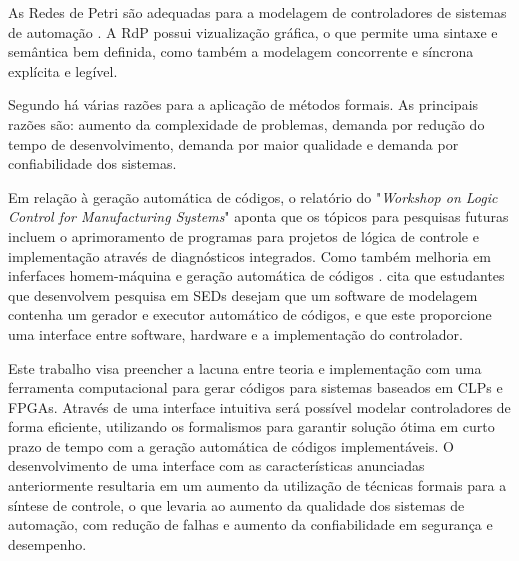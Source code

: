 As Redes de Petri s\~ao adequadas para a modelagem de controladores de sistemas de automa\c{c}\~ao \cite{gomes2007}. A RdP possui vizualiza\c{c}\~ao gr\'afica, o que permite uma sintaxe e sem\^antica bem definida, como tamb\'em a modelagem concorrente e s\'incrona expl\'icita e leg\'ivel.

Segundo \cite{Litz2000} h\'a v\'arias raz\~oes para a aplica\c{c}\~ao de m\'etodos formais. As principais raz\~oes s\~ao: aumento da complexidade de problemas, demanda por redu\c{c}\~ao do tempo de desenvolvimento, demanda por maior qualidade e demanda por confiabilidade dos sistemas.

Em rela\c{c}\~ao \`a gera\c{c}\~ao autom\'atica de c\'odigos, o relat\'orio do "\textit{Workshop on Logic Control for Manufacturing Systems}" \space aponta que os t\'opicos para pesquisas futuras incluem o aprimoramento de programas para projetos de l\'ogica de controle e implementação atrav\'es de diagn\'osticos integrados. Como tamb\'em melhoria em inferfaces homem-m\'aquina e gera\c{c}\~ao autom\'atica de c\'odigos \cite{workshop2000}. \cite{karenides} cita que estudantes que desenvolvem pesquisa em SEDs desejam que um software de modelagem contenha um gerador e executor autom\'atico de c\'odigos, e que este proporcione uma interface entre software, hardware e a implementa\c{c}\~ao do controlador.

 Este trabalho visa preencher a lacuna entre teoria e implementa\c{c}\~ao com uma ferramenta computacional para gerar c\'odigos para sistemas baseados em CLPs e FPGAs. Atrav\'es de uma interface intuitiva ser\'a poss\'ivel modelar controladores de forma eficiente, utilizando os formalismos para garantir solu\c{c}\~ao \'otima em curto prazo de tempo com a gera\c{c}\~ao autom\'atica de c\'odigos implement\'aveis. O desenvolvimento de uma interface com as caracter\'isticas anunciadas anteriormente resultaria em um aumento da utiliza\c{c}\~ao de t\'ecnicas formais para a s\'intese de controle, o que levaria ao aumento da qualidade dos sistemas de automa\c{c}\~ao, com redu\c{c}\~ao de falhas e aumento da confiabilidade em seguran\c{c}a e desempenho.
 



